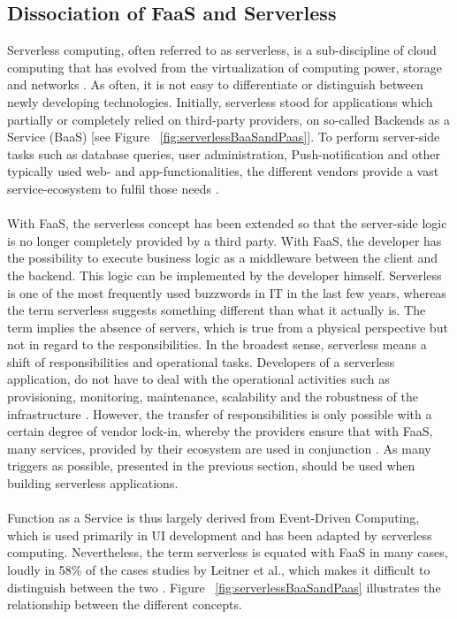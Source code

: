 \documentclass[a4paper,11pt, pagesize]{scrartcl}
\begin{document}
\begin{spacing}{1.2}
\subsection{Dissociation of FaaS and Serverless}
Serverless computing, often referred to as serverless, is a sub-discipline of cloud computing that has evolved from the virtualization of computing power, storage and networks \cite{jackson2018investigation}. As often, it is not easy to differentiate or distinguish between newly developing technologies. Initially, serverless stood for applications which partially or completely relied on third-party providers, on so-called Backends as a Service (BaaS) [see Figure ~\ref{fig:serverlessBaaSandPaas}]. To perform server-side tasks such as database queries, user administration, Push-notification and other typically used web- and app-functionalities, the different vendors provide a vast service-ecosystem to fulfil those needs \cite{fowler2018serverless}.\\\\ With FaaS, the serverless concept has been extended so that the server-side logic is no longer completely provided by a third party. With FaaS, the developer has the possibility to execute business logic as a middleware between the client and the backend. This logic can be implemented by the developer himself. Serverless is one of the most frequently used buzzwords in IT in the last few years, whereas the term \glqq serverless\grqq{} suggests something different than what it actually is. The term implies the absence of servers, which is true from a physical perspective but not in regard to the responsibilities. In the broadest sense, serverless means a shift of responsibilities and operational tasks. Developers of a serverless application, do not have to deal with the operational activities such as provisioning, monitoring, maintenance, scalability and the robustness of the infrastructure \cite{baldini2017serverless}. However, the transfer of responsibilities is only possible with a certain degree of vendor lock-in, whereby the providers ensure that with FaaS, many services, provided by their ecosystem are used in conjunction \cite{kritikos2018review}. As many triggers as possible, presented in the previous section, should be used when building serverless applications.\\\\ Function as a Service is thus largely derived from Event-Driven Computing, which is used primarily in UI development and has been adapted by serverless computing. Nevertheless, the term serverless is equated with FaaS in many cases, loudly in 58\% of the cases studies by Leitner et al., which makes it difficult to distinguish between the two \cite{leitner2019mixed}. Figure ~\ref{fig:serverlessBaaSandPaas} illustrates the relationship between the different concepts.\\

\end{spacing}
\end{document}
